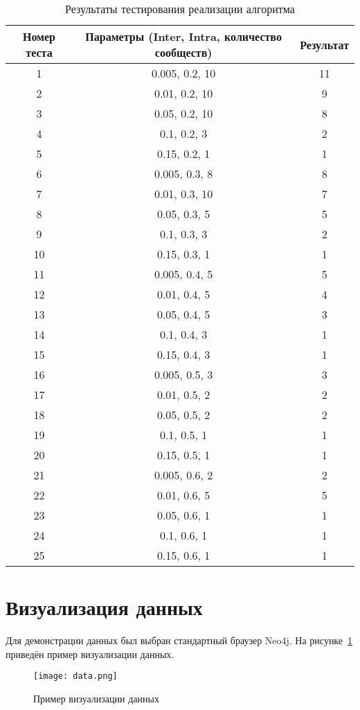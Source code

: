 \begin{table}[H]
\centering
\caption{Результаты тестирования реализации алгоритма}
\label{tab:test-results}
\begin{tabular}{|c|c|c|}
\hline
\textbf{Номер теста} & \textbf{Параметры (Inter, Intra, количество сообществ)} & \textbf{Результат} \\
\hline
1 & 0.005, 0.2, 10 & 11 \\
2 & 0.01, 0.2, 10  & 9  \\
3 & 0.05, 0.2, 10  & 8  \\
4 & 0.1,  0.2, 3  & 2  \\
5 & 0.15, 0.2, 1  & 1  \\
6 & 0.005, 0.3, 8 & 8  \\
7 & 0.01, 0.3, 10  & 7  \\
8 & 0.05, 0.3, 5  & 5  \\
9 & 0.1,  0.3, 3  & 2  \\
10 & 0.15, 0.3, 1 & 1  \\
11 & 0.005, 0.4, 5 & 5  \\
12 & 0.01, 0.4, 5 & 4  \\
13 & 0.05, 0.4, 5 & 3  \\
14 & 0.1,  0.4, 3 & 1  \\
15 & 0.15, 0.4, 3 & 1  \\
16 & 0.005, 0.5, 3 & 3  \\
17 & 0.01, 0.5, 2 & 2  \\
18 & 0.05, 0.5, 2 & 2  \\
19 & 0.1,  0.5, 1 & 1  \\
20 & 0.15, 0.5, 1 & 1  \\
21 & 0.005, 0.6, 2 & 2  \\
22 & 0.01, 0.6, 5 & 5  \\
23 & 0.05, 0.6, 1 & 1  \\
24 & 0.1,  0.6, 1 & 1  \\
25 & 0.15, 0.6, 1 & 1  \\
\hline
\end{tabular}
\end{table}

\section{Визуализация данных}

Для демонстрации данных был выбран стандартный браузер Neo4j. На рисунке~\ref{fig:data} приведён пример визуализации данных.

\begin{figure}[H]
	\centering
	\texttt{[image: data.png]}
	\caption{Пример визуализации данных}
	\label{fig:data}
\end{figure}

